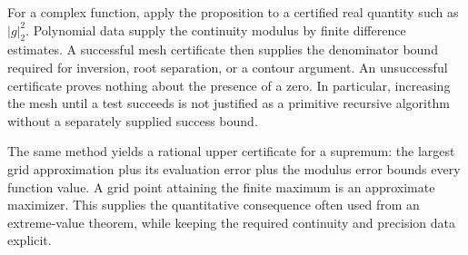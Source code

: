 For a complex function, apply the proposition to a certified real
quantity such as \(|g|_2^2\). Polynomial data supply the continuity
modulus by finite difference estimates. A successful mesh certificate
then supplies the denominator bound required for inversion, root
separation, or a contour argument. An unsuccessful certificate proves
nothing about the presence of a zero. In particular, increasing the
mesh until a test succeeds is not justified as a primitive recursive
algorithm without a separately supplied success bound.

The same method yields a rational upper certificate for a supremum:
the largest grid approximation plus its evaluation error plus the
modulus error bounds every function value. A grid point attaining the
finite maximum is an approximate maximizer. This supplies the
quantitative consequence often used from an extreme-value theorem,
while keeping the required continuity and precision data explicit.
